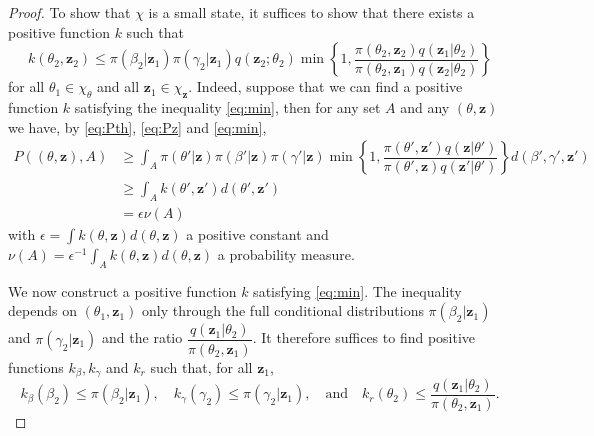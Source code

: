 \documentclass[12pt]{article}
\begin{document}
\begin{proof}
		To show that $\chi$ is a small state, it suffices to show that there exists a positive function $k$ such that
		\begin{equation}
			\label{eq:min}
			k(\theta_2, \mathbf{z}_2) \le \pi(\beta_2 | \mathbf{z}_1) \pi(\gamma_2 | \mathbf{z}_1) q(\mathbf{z}_2; \theta_2) \min\left\lbrace 1, \dfrac{\pi(\theta_2, \mathbf{z}_2)q(\mathbf{z}_1| \theta_2)}{\pi(\theta_2, \mathbf{z}_1)q(\mathbf{z}_2|\theta_2)} \right\rbrace
		\end{equation}
		for all $\theta_1 \in \chi_\theta$ and all $\mathbf{z}_1 \in \chi_\mathbf{z}.$
		Indeed, suppose that we can find a positive function $k$ satisfying the inequality \eqref{eq:min}, then for any set $A$ and any $(\theta, \mathbf{z})$ we have, by \eqref{eq:Pth}, \eqref{eq:Pz} and \eqref{eq:min},
		\begin{align*}
			P((\theta, \mathbf{z}), A)
			& \ge \int_A \pi(\theta' | \mathbf{z}) \pi(\beta' | \mathbf{z}) \pi(\gamma' | \mathbf{z}) \min\left\lbrace 1, \dfrac{\pi(\theta', \mathbf{z}')q(\mathbf{z}| \theta')}{\pi(\theta', \mathbf{z})q(\mathbf{z}'|\theta')} \right\rbrace d(\beta', \gamma', \mathbf{z}') \\
			& \ge \int_A k(\theta', \mathbf{z}') d(\theta', \mathbf{z}') \\
			& = \epsilon \nu(A)
		\end{align*}
		with $\epsilon = \int k(\theta, \mathbf{z}) d(\theta, \mathbf{z})$ a positive constant and $\nu(A) = \epsilon^{-1} \int_A k(\theta, \mathbf{z}) d(\theta, \mathbf{z})$ a probability measure. 
		
		We now construct a positive function $k$ satisfying \eqref{eq:min}. The inequality depends on $(\theta_1, \mathbf{z}_1)$ only through the full conditional distributions $\pi(\beta_2 | \mathbf{z}_1)$ and $\pi(\gamma_2 | \mathbf{z}_1)$ and the ratio $\dfrac{q(\mathbf{z}_1| \theta_2)}{\pi(\theta_2, \mathbf{z}_1)}$.
		It therefore suffices to find positive functions $k_\beta, k_\gamma$ and $k_r$ such that, for all $\mathbf{z}_1$,
		$$k_\beta(\beta_2) \le \pi(\beta_2 | \mathbf{z}_1),
		\quad k_\gamma(\gamma_2) \le \pi(\gamma_2 | \mathbf{z}_1),
		\quad \text{and} \quad k_r(\theta_2) \le \dfrac{q(\mathbf{z}_1|\theta_2)}{\pi(\theta_2, \mathbf{z}_1)}.$$
		

\end{proof}
\end{document}

